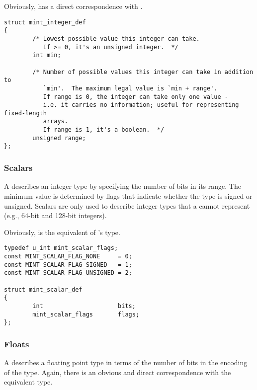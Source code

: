 Obviously,  has a direct correspondence with
.

\begin{verbatim}
struct mint_integer_def
{
        /* Lowest possible value this integer can take.
           If >= 0, it's an unsigned integer.  */
        int min;

        /* Number of possible values this integer can take in addition to
           `min'.  The maximum legal value is `min + range'.
           If range is 0, the integer can take only one value -
           i.e. it carries no information; useful for representing fixed-length
           arrays.
           If range is 1, it's a boolean.  */
        unsigned range;
};
\end{verbatim}


\subsubsection{Scalars}

A  describes an integer type by specifying the number of bits
in its range.  The minimum value is determined by flags that indicate whether
the type is signed or unsigned.  Scalars are only used to describe integer
types that a  cannot represent (e.g., 64-bit and 128-bit
integers).

Obviously,  is the \MINT{} equivalent of \AOI{}'s
 type.

\begin{verbatim}
typedef u_int mint_scalar_flags;
const MINT_SCALAR_FLAG_NONE     = 0;
const MINT_SCALAR_FLAG_SIGNED   = 1;
const MINT_SCALAR_FLAG_UNSIGNED = 2;

struct mint_scalar_def
{
        int                     bits;
        mint_scalar_flags       flags;
};
\end{verbatim}


\subsubsection{Floats}

A  describes a floating point type in terms of the number of
bits in the encoding of the type.  Again, there is an obvious and direct
correspondence with the equivalent \AOI{} type.

